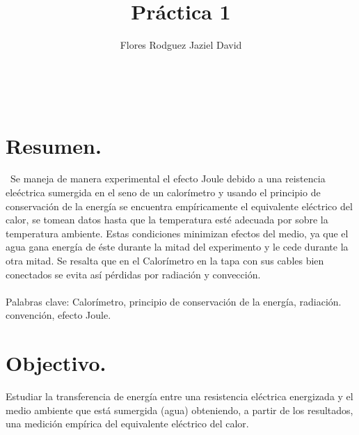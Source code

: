 \documentclass[11pt,a4paper]{article}
\author{Flores Rodguez Jaziel David }
\title{Práctica 1}
\begin{document}
\tableofcontents
\\
\medskip
\medskip
\section{Resumen.}
\
Se maneja de manera experimental el efecto Joule debido a una reistencia ele\'{e}ctrica sumergida en el seno de un calor\'{i}metro y usando el principio de conservaci\'{o}n de la energ\'{i}a se encuentra emp\'{i}ricamente el equivalente el\'{e}ctrico del calor, se tomean datos hasta que la temperatura est\'{e} adecuada por sobre la temperatura ambiente. Estas condiciones minimizan efectos del medio, ya que el agua gana energ\'{i}a de \'{e}ste durante la mitad del experimento y le cede durante la otra mitad. Se resalta que en el Calor\'{i}metro en la tapa con sus cables bien conectados se evita as\'{i} p\'{e}rdidas por radiaci\'{o}n y convecci\'{o}n.\\
\\

\medskip
Palabras clave: Calor\'{i}metro, principio de conservaci\'{o}n de la energ\'{i}a, radiaci\'{o}n. convenci\'{o}n, efecto Joule.


\section{Objectivo.}
Estudiar la transferencia de energ\'{i}a entre una resistencia el\'{e}ctrica energizada y el medio ambiente que est\'{a} sumergida (agua) obteniendo, a partir de los resultados, una medici\'{o}n emp\'{i}rica del equivalente el\'{e}ctrico del calor.
\pagebreak


\end{document}
